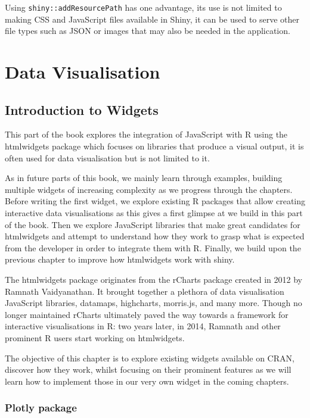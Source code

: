\documentclass[
  10pt,
]{krantz}
\begin{document}
Using \texttt{shiny::addResourcePath} has one advantage, its use is not limited to making CSS and JavaScript files available in Shiny, it can be used to serve other file types such as JSON or images that may also be needed in the application.

\hypertarget{part-data-visualisation}{%
\part{Data Visualisation}\label{part-data-visualisation}}

\hypertarget{widgets-intro-intro}{%
\chapter{Introduction to Widgets}\label{widgets-intro-intro}}

This part of the book explores the integration of JavaScript with R using the htmlwidgets package which focuses on libraries that produce a visual output, it is often used for data visualisation but is not limited to it.

As in future parts of this book, we mainly learn through examples, building multiple widgets of increasing complexity as we progress through the chapters. Before writing the first widget, we explore existing R packages that allow creating interactive data visualisations as this gives a first glimpse at we build in this part of the book. Then we explore JavaScript libraries that make great candidates for htmlwidgets and attempt to understand how they work to grasp what is expected from the developer in order to integrate them with R. Finally, we build upon the previous chapter to improve how htmlwidgets work with shiny.

The htmlwidgets package originates from the rCharts \citep{R-rCharts} package created in 2012 by Ramnath Vaidyanathan. It brought together a plethora of data visualisation JavaScript libraries, datamaps, highcharts, morris.js, and many more. Though no longer maintained rCharts ultimately paved the way towards a framework for interactive visualisations in R: two years later, in 2014, Ramnath and other prominent R users start working on htmlwidgets.

The objective of this chapter is to explore existing widgets available on CRAN, discover how they work, whilst focusing on their prominent features as we will learn how to implement those in our very own widget in the coming chapters.

\hypertarget{widgets-plotly}{%
\section{Plotly package}\label{widgets-plotly}}
\end{document}
